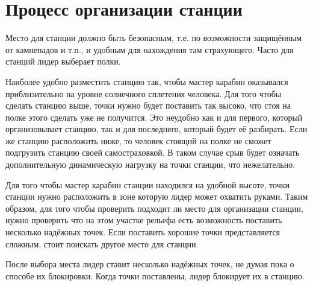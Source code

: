 \documentclass[fleqn, 12pt]{extarticle}
\begin{document}
\section{Процесс организации станции}
    Место для станции должно быть безопасным, т.е. по возможности защищённым от камнепадов и т.п., и удобным для нахождения там страхующего. Часто для станций лидер выберает полки.
    
    Наиболее удобно разместить станцию так, чтобы мастер карабин оказывался приблизительно на уровне солнечного сплетения человека. Для того чтобы сделать
    станцию выше, точки нужно будет поставить так высоко, что стоя на полке этого сделать уже не получится. Это неудобно как и для первого, который организовывает станцию,
    так и для последнего, который будет её разбирать. Если же станцию расположить ниже, то человек стоящий на полке не сможет подгрузить станцию своей самостраховкой.
    В таком случае срыв будет означать дополнительную динамическую нагрузку на точки станции, что нежелательно.
    
    Для того чтобы мастер карабин станции находился на удобной высоте, точки станции нужно расположить в зоне которую лидер может охватить руками. Таким образом,
    для того чтобы проверить подходит ли место для организации станции, нужно проверить что на этом участке рельефа есть возможность поставить несколько надёжных точек.
    Если поставить хорошие точки представляется сложным, стоит поискать другое место для станции.

    После выбора места лидер ставит несколько надёжных точек, не думая пока о способе их блокировки. Когда точки поставлены, лидер блокирует их в станцию.
\end{document}

